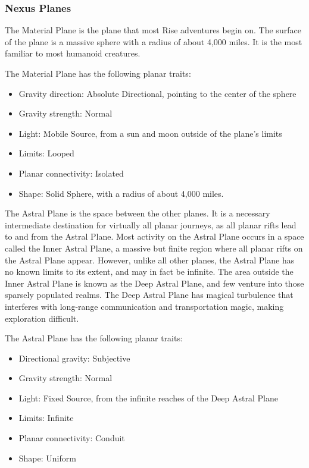     \subsubsection{Nexus Planes}

        \label{The Material Plane}
        The Material Plane is the plane that most Rise adventures begin on.
        The surface of the plane is a massive sphere with a radius of about 4,000 miles.
        It is the most familiar to most humanoid creatures.

        The Material Plane has the following planar traits:
        \begin{itemize}
            \item Gravity direction: Absolute Directional, pointing to the center of the sphere
            \item Gravity strength: Normal
            \item Light: Mobile Source, from a sun and moon outside of the plane's limits
            \item Limits: Looped
            \item Planar connectivity: Isolated
            \item Shape: Solid Sphere, with a radius of about 4,000 miles.
        \end{itemize}

    \label{The Astral Plane}
        The Astral Plane is the space between the other planes.
        It is a necessary intermediate destination for virtually all planar journeys, as all planar rifts lead to and from the Astral Plane.
        Most activity on the Astral Plane occurs in a space called the Inner Astral Plane, a massive but finite region where all planar rifts on the Astral Plane appear.
        However, unlike all other planes, the Astral Plane has no known limits to its extent, and may in fact be infinite.
        The area outside the Inner Astral Plane is known as the Deep Astral Plane, and few venture into those sparsely populated realms.
        The Deep Astral Plane has magical turbulence that interferes with long-range communication and transportation magic, making exploration difficult.

        The Astral Plane has the following planar traits:
        \begin{itemize}
            \item Directional gravity: Subjective
            \item Gravity strength: Normal
            \item Light: Fixed Source, from the infinite reaches of the Deep Astral Plane
            \item Limits: Infinite
            \item Planar connectivity: Conduit
            \item Shape: Uniform
        \end{itemize}

